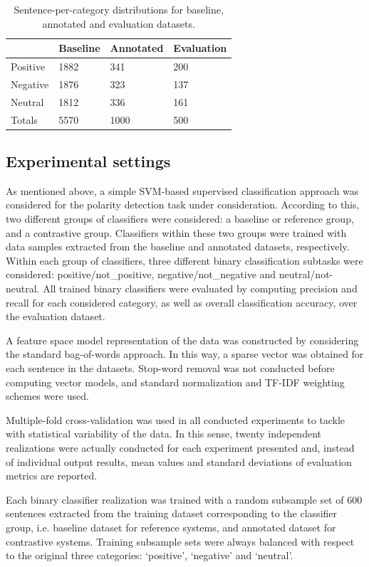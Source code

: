 \documentclass[11pt,letterpaper]{article}
\begin{document}
\begin{table}
\begin{tabular}{|l|l|l|l|}
\hline
&Baseline &Annotated &Evaluation \\
\hline
Positive &1882 &341 &200 \\
\hline
Negative &1876 &323 &137 \\
\hline
Neutral &1812 &336 &161 \\
\hline
Totals &5570 &1000 &500 \\
\hline
\end{tabular}
\caption{Sentence-per-category distributions for baseline, annotated and evaluation datasets.}
\label{tc_corpus}
\end{table}

\subsection{Experimental settings}
As mentioned above, a simple SVM-based supervised classification approach was considered for the
polarity detection task under consideration. According to this, two different groups of classifiers were 
considered: a baseline or reference group, and a contrastive group. Classifiers within these two groups were
trained with data samples extracted from the baseline and annotated datasets, respectively. Within each group 
of classifiers, three different binary classification subtasks were considered: positive/not\_positive, 
negative/not\_negative and neutral/not-neutral. All trained binary classifiers were evaluated by computing 
precision and recall for each considered category, as well as overall classification accuracy, over the 
evaluation dataset.

A feature space model representation of the data was constructed by considering the standard bag-of-words approach. 
In this way, a sparse vector was obtained for each sentence in the datasets. Stop-word removal was not
conducted before computing vector models, and standard normalization and TF-IDF weighting schemes were used.

Multiple-fold cross-validation was used in all conducted experiments to tackle with statistical variability of the 
data. In this sense, twenty independent realizations were actually conducted for each experiment presented and,
instead of individual output results, mean values and standard deviations of evaluation metrics are reported.

Each binary classifier realization was trained with a random subsample set of 600 sentences extracted from 
the training dataset corresponding to the classifier group, i.e. baseline dataset for reference systems, 
and annotated dataset for contrastive systems. Training subsample sets were always balanced with respect to 
the original three categories: `positive', `negative' and `neutral'.
\end{document}
